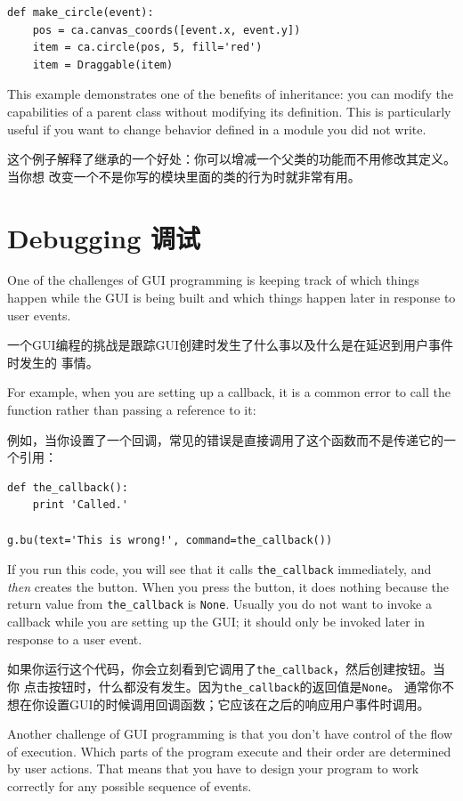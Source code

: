 \documentclass[10pt]{book}
\begin{document}
\begin{CJK}{UTF8}{gbsn}
\begin{verbatim}
def make_circle(event):
    pos = ca.canvas_coords([event.x, event.y])
    item = ca.circle(pos, 5, fill='red')
    item = Draggable(item)
\end{verbatim}
%
This example demonstrates one of the benefits of inheritance: you can
modify the capabilities of a parent class without modifying its
definition.  This is particularly useful if you want to change
behavior defined in a module you did not write.

这个例子解释了继承的一个好处：你可以增减一个父类的功能而不用修改其定义。当你想
改变一个不是你写的模块里面的类的行为时就非常有用。


\section{Debugging 调试}

One of the challenges of GUI programming is keeping track of
which things happen while the GUI is being built and which
things happen later in response to user events.

一个GUI编程的挑战是跟踪GUI创建时发生了什么事以及什么是在延迟到用户事件时发生的
事情。

For example, when you are setting up a callback, it is a common error
to call the function rather than passing a reference to it:

例如，当你设置了一个回调，常见的错误是直接调用了这个函数而不是传递它的一个引用：

\begin{verbatim}
def the_callback():
    print 'Called.'

g.bu(text='This is wrong!', command=the_callback())
\end{verbatim}
%
If you run this code, you will see that it calls \verb"the_callback"
immediately, and {\em then} creates the button.  When you press the
button, it does nothing because the return value from 
\verb"the_callback" is {\tt None}.
Usually you do not want to invoke a callback while you are
setting up the GUI; it should only be invoked later in response to
a user event.

如果你运行这个代码，你会立刻看到它调用了\verb"the_callback"，然后创建按钮。当你
点击按钮时，什么都没有发生。因为\verb"the_callback"的返回值是{\tt None}。
通常你不想在你设置GUI的时候调用回调函数；它应该在之后的响应用户事件时调用。

Another challenge of GUI programming is that you don't have control
of the flow of execution.  Which parts of the program execute
and their order are determined by user actions.
That means that you have to design your program to work correctly
for any possible sequence of events.


\end{CJK}
\end{document}
